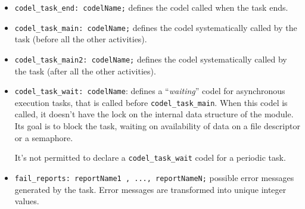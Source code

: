 \begin{itemize}
\item[]{\tt codel\_task\_end:  codelName;} defines the codel called when the task ends.

\item[]{\tt codel\_task\_main:  codelName;} defines the codel systematically
called by the task (before all the other activities).

\item[]{\tt codel\_task\_main2:  codelName;} defines the codel systematically
called by the task (after all the other activities).

\item[]\texttt{codel\_task\_wait: codelName}: defines a
``\emph{waiting}'' codel for asynchronous execution tasks, that is
called before \texttt{codel\_task\_main}.  When this codel
is called, it doesn't have the lock on the internal data structure of
the module. Its goal is to block the task, waiting on availability of
data on a file descriptor or a semaphore. 

It's not permitted to declare a \texttt{codel\_task\_wait} codel for a
periodic task.

\item[]{\tt fail\_reports:  reportName1 , ..., reportNameN;} 
possible error messages generated by the task. Error messages are
transformed into unique integer values.
\end{itemize}
